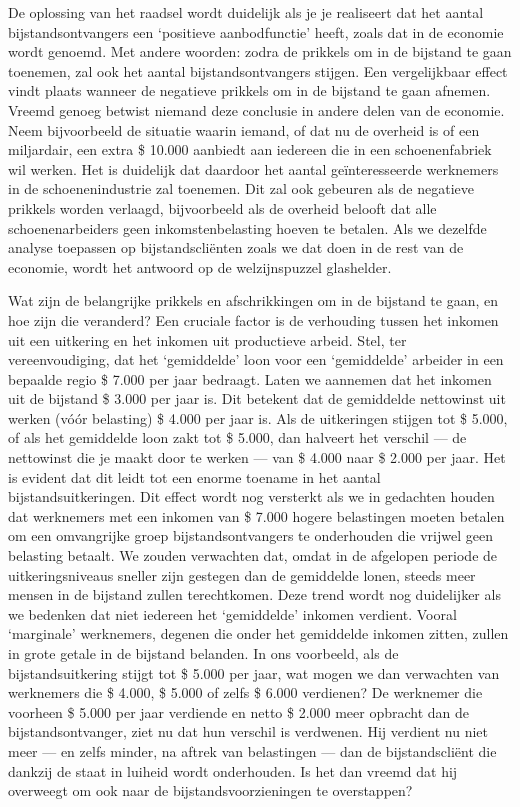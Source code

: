 \documentclass[
  a5paper,
  smalldemyvopaper,10pt,twoside,onecolumn,openright,extrafontsizes,hidelinks]{memoir}
\begin{document}
De oplossing van het raadsel wordt duidelijk als je je realiseert dat
het aantal bijstandsontvangers een `positieve aanbodfunctie' heeft,
zoals dat in de economie wordt genoemd. Met andere woorden: zodra de
prikkels om in de bijstand te gaan toenemen, zal ook het aantal
bijstandsontvangers stijgen. Een vergelijkbaar effect vindt plaats
wanneer de negatieve prikkels om in de bijstand te gaan afnemen. Vreemd
genoeg betwist niemand deze conclusie in andere delen van de economie.
Neem bijvoorbeeld de situatie waarin iemand, of dat nu de overheid is of
een miljardair, een extra \$ 10.000 aanbiedt aan iedereen die in een
schoenenfabriek wil werken. Het is duidelijk dat daardoor het aantal
geïnteresseerde werknemers in de schoenenindustrie zal toenemen. Dit zal
ook gebeuren als de negatieve prikkels worden verlaagd, bijvoorbeeld als
de overheid belooft dat alle schoenenarbeiders geen inkomstenbelasting
hoeven te betalen. Als we dezelfde analyse toepassen op
bijstandscliënten zoals we dat doen in de rest van de economie, wordt
het antwoord op de welzijnspuzzel glashelder.

Wat zijn de belangrijke prikkels en afschrikkingen om in de bijstand te
gaan, en hoe zijn die veranderd? Een cruciale factor is de verhouding
tussen het inkomen uit een uitkering en het inkomen uit productieve
arbeid. Stel, ter vereenvoudiging, dat het `gemiddelde' loon voor een
`gemiddelde' arbeider in een bepaalde regio \$ 7.000 per jaar bedraagt.
Laten we aannemen dat het inkomen uit de bijstand \$ 3.000 per jaar is.
Dit betekent dat de gemiddelde nettowinst uit werken (vóór belasting) \$
4.000 per jaar is. Als de uitkeringen stijgen tot \$ 5.000, of als het
gemiddelde loon zakt tot \$ 5.000, dan halveert het verschil --- de
nettowinst die je maakt door te werken --- van \$ 4.000 naar \$ 2.000
per jaar. Het is evident dat dit leidt tot een enorme toename in het
aantal bijstandsuitkeringen. Dit effect wordt nog versterkt als we in
gedachten houden dat werknemers met een inkomen van \$ 7.000 hogere
belastingen moeten betalen om een omvangrijke groep bijstandsontvangers
te onderhouden die vrijwel geen belasting betaalt. We zouden verwachten
dat, omdat in de afgelopen periode de uitkeringsniveaus sneller zijn
gestegen dan de gemiddelde lonen, steeds meer mensen in de bijstand
zullen terechtkomen. Deze trend wordt nog duidelijker als we bedenken
dat niet iedereen het `gemiddelde' inkomen verdient. Vooral `marginale'
werknemers, degenen die onder het gemiddelde inkomen zitten, zullen in
grote getale in de bijstand belanden. In ons voorbeeld, als de
bijstandsuitkering stijgt tot \$ 5.000 per jaar, wat mogen we dan
verwachten van werknemers die \$ 4.000, \$ 5.000 of zelfs \$ 6.000
verdienen? De werknemer die voorheen \$ 5.000 per jaar verdiende en
netto \$ 2.000 meer opbracht dan de bijstandsontvanger, ziet nu dat hun
verschil is verdwenen. Hij verdient nu niet meer --- en zelfs minder, na
aftrek van belastingen --- dan de bijstandscliënt die dankzij de staat
in luiheid wordt onderhouden. Is het dan vreemd dat hij overweegt om ook
naar de bijstandsvoorzieningen te overstappen?
\end{document}
